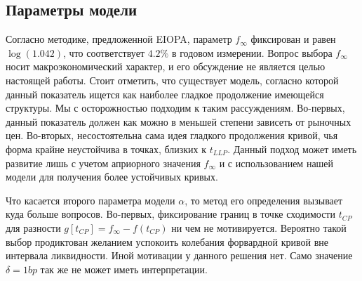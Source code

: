 \documentclass[10pt]{article}
\theoremstyle{definition}
\theoremstyle{remark}
\theoremstyle{plain}
\newcommand{\w}{f_\infty}
\begin{document}
\subsection{Параметры модели}
Согласно методике, предложенной EIOPA, параметр $\w$ фиксирован и равен $\log(1.042)$, что соответствует $4.2\%$ в годовом измерении. Вопрос выбора $\w$ носит макроэкономический характер, и его обсуждение не является целью настоящей работы. Стоит отметить, что существует модель, согласно которой данный показатель ищется как наиболее гладкое продолжение имеющейся структуры. Мы с осторожностью подходим к таким рассуждениям. 
Во-первых, данный показатель должен как можно в меньшей степени зависеть от рыночных цен. Во-вторых,  несостоятельна сама идея гладкого продолжения кривой, чья форма крайне неустойчива в точках, близких к $t_{LLP}$. Данный подход может иметь развитие лишь с учетом  априорного значения $\w$ и с использованием нашей модели для получения более устойчивых кривых.

Что касается второго параметра модели $\alpha$, то метод его определения вызывает куда больше вопросов. Во-первых, фиксирование границ в точке сходимости $t_{CP}$ для разности $g[t_{CP}] = \w-f(t_{CP})$ ни чем не мотивируется. Вероятно такой выбор продиктован желанием успокоить колебания форвардной кривой вне интервала ликвидности. Иной мотивации у данного решения нет. Само значение $\delta = 1bp$ так же не может иметь интерпретации. 
\end{document}
